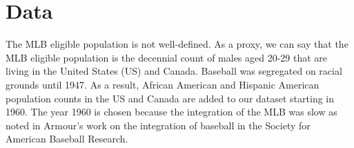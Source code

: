 \documentclass[11pt]{article}\usepackage[]{graphicx}\usepackage[]{color}
\begin{document}


\section{Data}




The MLB eligible population is not well-defined.  As a proxy, we can say 
that the MLB eligible population is the decennial count of males aged 
20-29 that are living in the United States (US) 
and Canada. 
Baseball was segregated on racial grounds until 1947.  As a result, 
African American and Hispanic American population counts in the US  
and Canada are added to our dataset starting in 1960.  The year 1960 is chosen 
because the integration of the MLB was slow as noted in Armour's work on the 
integration of baseball in the Society for American Baseball Research.

\end{document}
